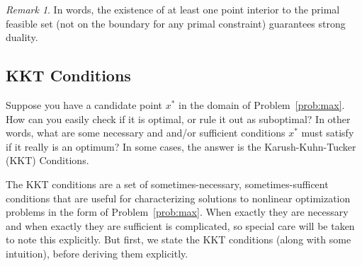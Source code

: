 \documentclass[12pt]{article}
\numberwithin{equation}{section} %
\theoremstyle{plain}
\theoremstyle{definition}
\theoremstyle{remark}
\newtheorem*{rmk}{Remark}
\begin{document}
\begin{rmk}
In words, the existence of at least one point interior to the primal
feasible set (not on the boundary for any primal constraint) guarantees
strong duality.
\end{rmk}


\clearpage
\subsection{KKT Conditions}

Suppose you have a candidate point $x^*$ in the domain of
Problem~\ref{prob:max}.  How can you easily check if it is optimal, or
rule it out as suboptimal? In other words, what are some necessary and
and/or sufficient conditions $x^*$ must satisfy if it really is
an optimum?  In some cases, the answer is the Karush-Kuhn-Tucker (KKT)
Conditions.

The KKT conditions are a set of sometimes-necessary, sometimes-sufficent
conditions that are useful for characterizing solutions to nonlinear
optimization problems in the form of Problem~\ref{prob:max}. When
exactly they are necessary and when exactly they are sufficient is
complicated, so special care will be taken to note this explicitly.
But first, we state the KKT conditions (along with some intuition),
before deriving them explicitly.


\end{document}
